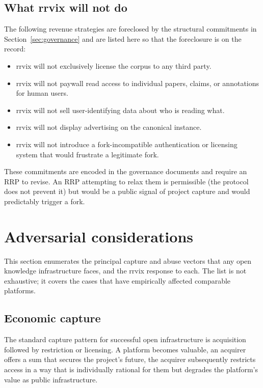 \documentclass[11pt]{rrvix}
\begin{document}
\subsection{What rrvix will not do}

The following revenue strategies are foreclosed by the structural commitments in Section~\ref{sec:governance} and are listed here so that the foreclosure is on the record:

\begin{itemize}[leftmargin=2em]
\item rrvix will not exclusively license the corpus to any third party.
\item rrvix will not paywall read access to individual papers, claims, or annotations for human users.
\item rrvix will not sell user-identifying data about who is reading what.
\item rrvix will not display advertising on the canonical instance.
\item rrvix will not introduce a fork-incompatible authentication or licensing system that would frustrate a legitimate fork.
\end{itemize}

These commitments are encoded in the governance documents and require an RRP to revise. An RRP attempting to relax them is permissible (the protocol does not prevent it) but would be a public signal of project capture and would predictably trigger a fork.

\section{Adversarial considerations}
\label{sec:adversarial}

This section enumerates the principal capture and abuse vectors that any open knowledge infrastructure faces, and the rrvix response to each. The list is not exhaustive; it covers the cases that have empirically affected comparable platforms.

\subsection{Economic capture}

The standard capture pattern for successful open infrastructure is acquisition followed by restriction or licensing. A platform becomes valuable, an acquirer offers a sum that secures the project's future, the acquirer subsequently restricts access in a way that is individually rational for them but degrades the platform's value as public infrastructure.
\end{document}

